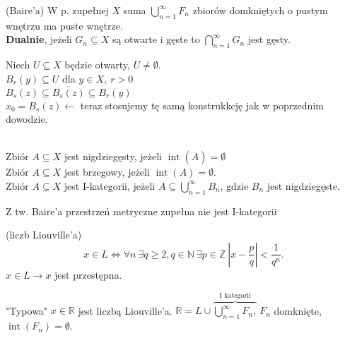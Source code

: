 \begin{tw} (Baire'a) W p. zupełnej $X$ suma $\bigcup\limits_{n=1}^\infty F_n$ zbiorów domkniętych o pustym wnętrzu ma puste wnętrze. \\ 
    \textbf{Dualnie}, jeżeli $G_n \subseteq X$ są otwarte i gęste to $\bigcap\limits_{n=1}^\infty G_n$ jest gęsty.
\end{tw} 
\begin{dd} 
    Niech $U \subseteq X$ będzie otwarty, $U \neq \emptyset$. \\ 
    $B_r(y) \subseteq U$ dla $y \in X,\ r > 0$ \\
    $B_s(z) \subseteq \overline{B_s(z)} \subseteq B_r(y)$ \\ 
    $x_0 = \overline{B_s(z)} \leftarrow$ teraz stosujemy tę samą konstrukkcję jak w poprzednim dowodzie.
\end{dd} 
\begin{df} ~\\
    Zbiór $ A \subseteq X$ jest nigdziegęsty, jeżeli $\operatorname{int}(\overline{A}) = \emptyset$ \\
    Zbiór $A \subseteq X$ jest brzegowy, jeżeli $\operatorname{int}(A) = \emptyset$. \\ 
    Zbiór $A \subseteq X$ jest I-kategorii, jeżeli $A \subseteq \bigcup\limits_{n=1}^\infty B_n$, gdzie $B_n$ jest nigdziegęste.
\end{df} 
\begin{uw} Z tw. Baire'a przestrzeń metryczne zupełna nie jest I-kategorii \end{uw}
\begin{df} (liczb Liouville'a)
    $$ x \in L \Leftrightarrow \forall n \ \exists q \ge 2, q \in \mathbb{N} \ \exists p \in \mathbb{Z} \ |x - \frac{p}{q}| < \frac{1}{q^n}. $$
    $x \in L \rightarrow x$ jest przestępna. \end{df}
    "Typowa" $x \in \mathbb{R}$ jest liczbą Liouville'a. $\mathbb{R} = L \cup \overbrace{\bigcup\limits_{n=1}^\infty F_n,}^{\text{I kategorii}} \ F_n$
    domknięte, $\operatorname{int}(F_n) = \emptyset$. 

